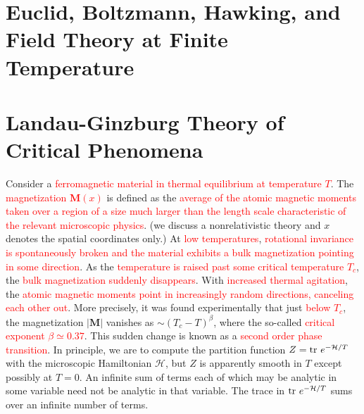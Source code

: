 \documentclass[11pt,a4paper]{article}
\renewcommand{\vec}[1]{\boldsymbol{#1}}
\newcounter{theo}[section]\setcounter{theo}{0}
\begin{document}
\section{Euclid, Boltzmann, Hawking, and Field Theory at Finite Temperature}





































\section{Landau-Ginzburg Theory of Critical Phenomena}
Consider a \textcolor{red}{ferromagnetic material in thermal equilibrium at temperature $T$}. The \textcolor{red}{magnetization $\vec{M}(x)$} is defined as the \textcolor{red}{average of the atomic magnetic moments taken over a region of a size much larger than the length scale characteristic of the relevant microscopic physics}. (we discuss a nonrelativistic theory and $x$ denotes the spatial coordinates only.) At \textcolor{red}{low temperatures}, \textcolor{red}{rotational invariance is spontaneously broken and the material exhibits a bulk magnetization pointing in some direction}. As the \textcolor{red}{temperature is raised past some critical temperature $T_c$}, the \textcolor{red}{bulk magnetization suddenly disappears}. With \textcolor{red}{increased thermal agitation}, the \textcolor{red}{atomic magnetic moments point in increasingly random directions, canceling each other out}. More precisely, it was found experimentally that just \textcolor{red}{below $T_c$}, the magnetization $|\vec{M}|$ vanishes as $\sim (T_c - T)^\beta$, where the so-called \textcolor{red}{critical exponent $\beta \simeq 0.37$}. This sudden change is known as a \textcolor{red}{second order phase transition}. In principle, we are to compute the partition function $Z = {\rm tr} ~e^{-\mathcal H/T}$ with the microscopic Hamiltonian $\mathcal H$, but $Z$ is apparently smooth in $T$ except possibly at $T = 0$. An infinite sum of terms each of which may be analytic in some variable need not be analytic in that variable. The trace in ${\rm tr} ~e^{-\mathcal H/T}$ sums over an infinite number of terms.
\end{document}
